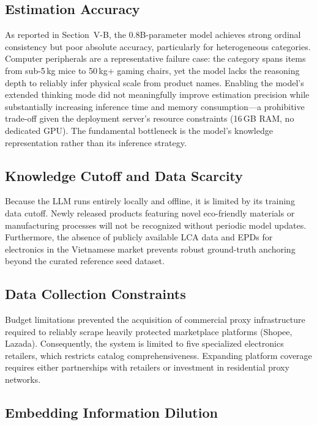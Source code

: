 \documentclass[conference]{IEEEtran}
\begin{document}
\subsection{Estimation Accuracy}

As reported in Section~V-B, the 0.8B-parameter model achieves strong ordinal consistency but poor absolute accuracy, particularly for heterogeneous categories. Computer peripherals are a representative failure case: the category spans items from sub-5\,kg mice to 50\,kg+ gaming chairs, yet the model lacks the reasoning depth to reliably infer physical scale from product names. Enabling the model's extended thinking mode did not meaningfully improve estimation precision while substantially increasing inference time and memory consumption---a prohibitive trade-off given the deployment server's resource constraints (16\,GB RAM, no dedicated GPU). The fundamental bottleneck is the model's knowledge representation rather than its inference strategy.

\subsection{Knowledge Cutoff and Data Scarcity}

Because the LLM runs entirely locally and offline, it is limited by its training data cutoff. Newly released products featuring novel eco-friendly materials or manufacturing processes will not be recognized without periodic model updates. Furthermore, the absence of publicly available LCA data and EPDs for electronics in the Vietnamese market prevents robust ground-truth anchoring beyond the curated reference seed dataset.

\subsection{Data Collection Constraints}

Budget limitations prevented the acquisition of commercial proxy infrastructure required to reliably scrape heavily protected marketplace platforms (Shopee, Lazada). Consequently, the system is limited to five specialized electronics retailers, which restricts catalog comprehensiveness. Expanding platform coverage requires either partnerships with retailers or investment in residential proxy networks.

\subsection{Embedding Information Dilution}
\end{document}
